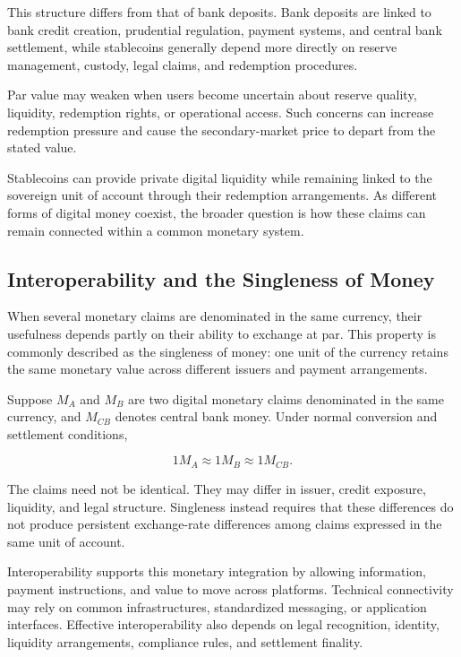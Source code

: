 This structure differs from that of bank deposits. Bank deposits are linked to bank credit creation, prudential regulation, payment systems, and central bank settlement, while stablecoins generally depend more directly on reserve management, custody, legal claims, and redemption procedures.

Par value may weaken when users become uncertain about reserve quality, liquidity, redemption rights, or operational access. Such concerns can increase redemption pressure and cause the secondary-market price to depart from the stated value.

Stablecoins can provide private digital liquidity while remaining linked to the sovereign unit of account through their redemption arrangements. As different forms of digital money coexist, the broader question is how these claims can remain connected within a common monetary system.


\subsection{Interoperability and the Singleness of Money}

When several monetary claims are denominated in the same currency, their usefulness depends partly on their ability to exchange at par. This property is commonly described as the singleness of money: one unit of the currency retains the same monetary value across different issuers and payment arrangements.

Suppose \(M_A\) and \(M_B\) are two digital monetary claims denominated in the same currency, and \(M_{CB}\) denotes central bank money. Under normal conversion and settlement conditions,

\begin{equation}
1M_A \approx 1M_B \approx 1M_{CB}.
\label{eq:ch24-singleness}
\end{equation}

The claims need not be identical. They may differ in issuer, credit exposure, liquidity, and legal structure. Singleness instead requires that these differences do not produce persistent exchange-rate differences among claims expressed in the same unit of account.

Interoperability supports this monetary integration by allowing information, payment instructions, and value to move across platforms. Technical connectivity may rely on common infrastructures, standardized messaging, or application interfaces. Effective interoperability also depends on legal recognition, identity, liquidity arrangements, compliance rules, and settlement finality.

